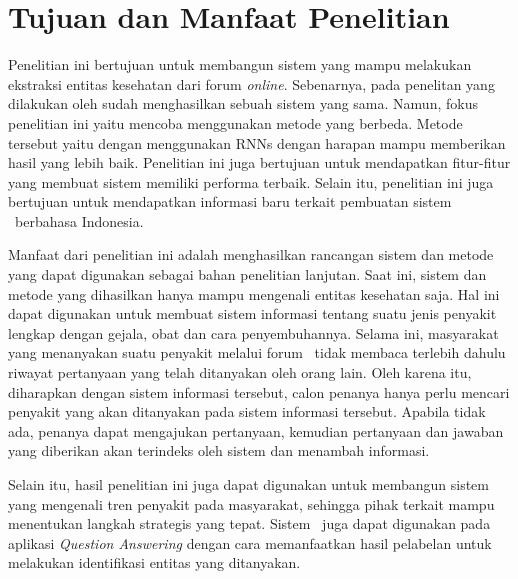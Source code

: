 \section{Tujuan dan Manfaat Penelitian}
Penelitian ini bertujuan untuk membangun sistem yang mampu melakukan ekstraksi entitas kesehatan dari forum \textit{online}. Sebenarnya, pada penelitan yang dilakukan oleh \cite{skripsiKakRadit} sudah menghasilkan sebuah sistem yang sama. Namun, fokus penelitian ini yaitu mencoba menggunakan metode yang berbeda. Metode tersebut yaitu dengan menggunakan RNNs dengan harapan mampu memberikan hasil yang lebih baik. Penelitian ini juga bertujuan untuk mendapatkan fitur-fitur yang membuat sistem memiliki performa terbaik. Selain itu, penelitian ini juga bertujuan untuk mendapatkan informasi baru terkait pembuatan sistem \mer~berbahasa Indonesia.

Manfaat dari penelitian ini adalah menghasilkan rancangan sistem dan metode yang dapat digunakan sebagai bahan penelitian lanjutan. Saat ini, sistem dan metode yang dihasilkan hanya mampu mengenali entitas kesehatan saja. Hal ini dapat digunakan untuk membuat sistem informasi tentang suatu jenis penyakit lengkap dengan gejala, obat dan cara penyembuhannya. Selama ini, masyarakat yang menanyakan suatu penyakit melalui forum \ol~tidak membaca terlebih dahulu riwayat pertanyaan yang telah ditanyakan oleh orang lain. Oleh karena itu, diharapkan dengan sistem informasi tersebut, calon penanya hanya perlu mencari penyakit yang akan ditanyakan pada sistem informasi tersebut. Apabila tidak ada, penanya dapat mengajukan pertanyaan, kemudian pertanyaan dan jawaban yang diberikan akan terindeks oleh sistem dan menambah informasi. 

Selain itu, hasil penelitian ini juga dapat digunakan untuk membangun sistem yang mengenali tren penyakit pada masyarakat, sehingga pihak terkait mampu menentukan langkah strategis yang tepat. Sistem \mer~juga dapat digunakan pada aplikasi \textit{Question Answering} \citep{abacha2011medical} dengan cara memanfaatkan hasil pelabelan untuk melakukan identifikasi entitas yang ditanyakan.

